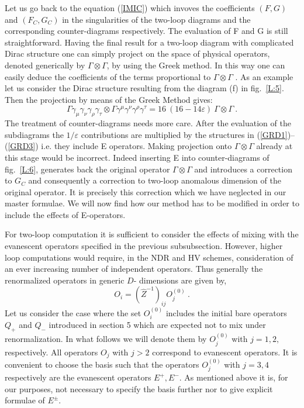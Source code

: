 \documentclass[12pt,rotate]{article}
\newcommand{\be}{\begin{equation}}
\newcommand{\ee}{\end{equation}}
\begin{document}
\begin{itemize}
\begin{itemize}
Let us go back to the equation (\ref{IMIC}) which invoves the coefficients
$(F,G)$ and $(F_C,G_C)$ in the singularities of the two-loop
diagrams and the corresponding counter-diagrams respectively.
The evaluation of F and G  is still 
straightforward. Having the final result for a two-loop
diagram with complicated Dirac  structure one 
can simply project on the space of physical operators, denoted
generically by $\Gamma\otimes\Gamma$,
by using the Greek method. 
In this way one can easily deduce the coefficients of the terms 
proportional to  
$\Gamma\otimes\Gamma$ . As an example let us consider
the Dirac structure resulting from the diagram (f) in
fig.~\ref{L:5}. Then
the projection by means of the Greek Method gives:
\be\label{GRTW}
\Gamma\gamma_\mu\gamma_\nu\gamma_\rho\gamma_\tau\otimes\Gamma
\gamma^\mu\gamma^\nu\gamma^\rho\gamma^\tau=
16~(16-14\varepsilon)~\Gamma\otimes\Gamma~.
\ee
The treatment of counter-diagrams needs more care. After the evaluation
 of the subdiagrams the $1/\varepsilon$ contributions are multiplied
by the structures in (\ref{GRD1})--(\ref{GRD3}) 
i.e. they 
include E operators. Making projection onto $\Gamma\otimes\Gamma$ 
 already at this stage would be 
incorrect. Indeed inserting E into  counter-diagrams of
 fig.~\ref{L:6}, generates  back the 
original operator $\Gamma\otimes\Gamma$ and introduces a correction 
to $G_C$ and consequently a correction
to two-loop  anomalous dimension 
of the original operator. It is precisely this correction which
 we have neglected in our master formulae. We will now find how
 our method has to be modified in order to include the effects
 of E-operators.

 For two-loop computation it is sufficient to consider the effects
 of mixing with the evanescent operators   specified
 in the previous subsubsection.
  However, higher loop computations would require,
 in the NDR and HV schemes, consideration of
 an ever increasing number of independent
 operators. Thus generally
 the renormalized operators in generic
 $D$- dimensions are given by,
\be
 O_{i} = (\hat Z^{-1})_{i j} O^{(0)}_{j}~.
\ee
Let us consider the case where the set $O^{(0)}_{i}$ includes the initial 
bare operators $Q_+$ and $Q_-$ introduced in section 5 which are expected
not to mix under renormalization. In what follows we will denote them by
$O^{(0)}_{j}$ with  $j=1,2,$ respectively. All operators $O_{j}$  
with $j>2$  correspond to evanescent operators. It is convenient
 to choose the basis such that the operators
 $O^{(0)}_{j}$ with $j=3,4$ respectively are the
 evanescent operators $E^{+},E^{-}$. As mentioned above it is, for
 our purposes, not necessary to specify the basis further nor to
give explicit formulae of $E^\pm$.
 

\end{itemize}
\end{itemize}
\end{document}
